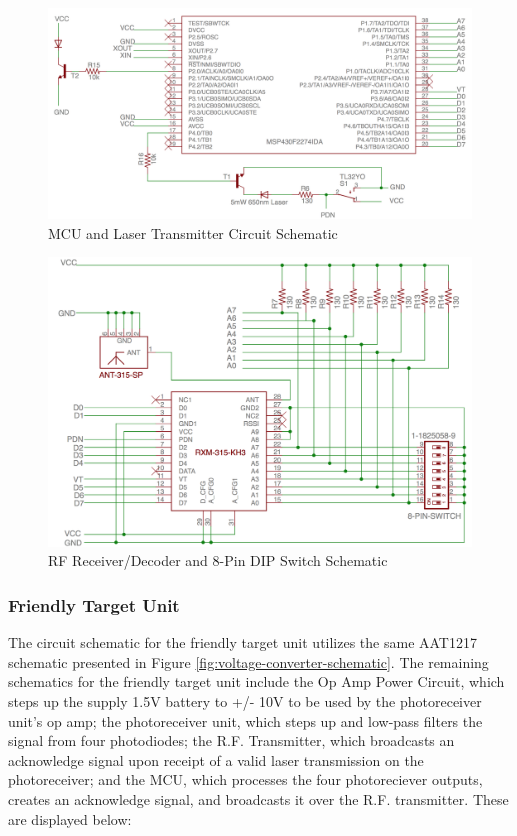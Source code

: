 \documentclass[letterpaper,10pt]{article}
\begin{document}
\begin{spacing}{1.15}
\begin{figure} [H]
	\centering
	\includegraphics[scale=0.43]{MCU_Laser_Schematic.png}
	\caption{MCU and Laser Transmitter Circuit Schematic\label{fig:mcu-laser-schematic}}
\end{figure}

\begin{figure} [H]
	\centering
	\includegraphics[scale=0.5]{RF_Receiver_Decoder_Schematic.png}
	\caption{RF Receiver/Decoder and 8-Pin DIP Switch Schematic\label{fig:rf-receiver-decoder-schematic}}
\end{figure}


\subsubsection{Friendly Target Unit}
The circuit schematic for the friendly target unit utilizes the same AAT1217 schematic presented in Figure \ref{fig:voltage-converter-schematic}. The remaining schematics for the friendly target unit include the Op Amp Power Circuit, which steps up the supply 1.5V battery to +/- 10V to be used by the photoreceiver unit's op amp; the photoreceiver unit, which steps up and low-pass filters the signal from four photodiodes; the R.F. Transmitter, which broadcasts an acknowledge signal upon receipt of a valid laser transmission on the photoreceiver; and the MCU, which processes the four photoreciever outputs, creates an acknowledge signal, and broadcasts it over the R.F. transmitter. These are displayed below:


\end{spacing}
\end{document}
